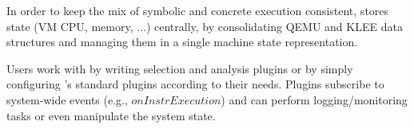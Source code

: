In order to keep the mix of symbolic and concrete execution consistent, \sse stores state (VM CPU, memory, ...) centrally, by consolidating QEMU and KLEE data structures and managing them in a single machine state representation.


Users work with \sse by writing selection and analysis plugins or by simply configuring \sse's standard plugins according to their needs.
Plugins subscribe to system-wide events (e.g., $onInstrExecution$) and can perform logging/monitoring tasks or even manipulate the system state.





\iffalse
§3	The S2E Platform
		> Architektur
		> Funktionsweise
		> Selektoren + Analysatoren
\fi